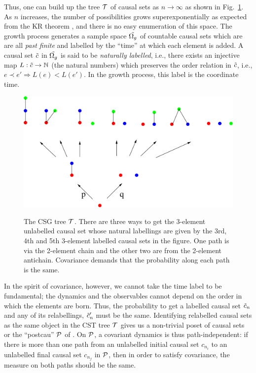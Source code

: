 Thus, one can build up the tree $\mathcal T$ of causal sets as $n\rightarrow \infty $ as shown in
Fig.~\ref{csgtree.fig}. As $n$ increases, the number of possibilities grows superexponentially as expected from the KR
theorem \citep{kr},  and there is no easy enumeration of this space. 
The growth process generates a sample space $\tilde {\Omega_g}$ 
of countable causal sets which are are all \emph{past finite} and labelled by the ``time'' at which each element is
added. A causal set $\tilde c$ in $\tilde {\Omega_g}$ is said to be \emph{naturally  labelled}, i.e., there exists an injective map   
$L: \tilde c \rightarrow \mathbb N$ (the natural numbers) which 
preserves the order relation in $\tilde c$, i.e., $e \prec e' \Rightarrow L(e) < L(e')$. In the growth process, this label is the
coordinate time. 

\begin{figure}[ht]
  \centering \resizebox{4in}{!} {\includegraphics[width=\textwidth]{growththree}} 
  \caption{The CSG tree $\mathcal T$. There are three ways to get the  3-element unlabelled causal set
      whose natural labellings are given by the 3rd, 4th and 5th 3-element labelled causal sets in the figure. One path
      is via the 2-element chain and the other two are from the 2-element antichain. Covariance
      demands that the probability along each path is the same.}
    \label{csgtree.fig}
\end{figure}

In the spirit of covariance,  however, we cannot take  the  time label to be  fundamental; the dynamics and the
observables cannot depend on the order in which the elements are born. Thus, the probability to get a labelled causal set $\tilde c_n$
and any of its relabellings,  $\tilde c_n'$ must be  the same.  Identifying relabelled causal sets as the same object in the CST tree
$\mathcal T$ gives us a non-trivial poset of causal sets or the ``postcau''  $\mathcal P$ of \cite{csg}. On $\mathcal P$, 
a  covariant dynamics is thus path-independent: if there is more than one path from an unlabelled initial
causal set $c_{n_{i}}$ to an unlabelled final causal set $c_{n_{f}}$ in $\mathcal P$, then in order to satisfy covariance,
the measure on both
paths should be  the same. 

